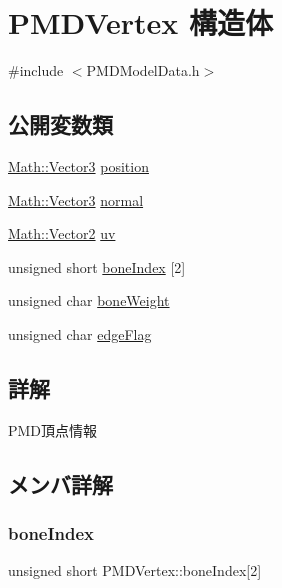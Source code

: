 \hypertarget{struct_p_m_d_vertex}{}\section{P\+M\+D\+Vertex 構造体}
\label{struct_p_m_d_vertex}


{\ttfamily \#include $<$P\+M\+D\+Model\+Data.\+h$>$}

\subsection*{公開変数類}
\begin{DoxyCompactItemize}
\item 
\mbox{\hyperlink{struct_math_1_1_vector3}{Math\+::\+Vector3}} \mbox{\hyperlink{struct_p_m_d_vertex_af9eb3741205512ac55530a52d0102bc0}{position}}
\item 
\mbox{\hyperlink{struct_math_1_1_vector3}{Math\+::\+Vector3}} \mbox{\hyperlink{struct_p_m_d_vertex_afa1e149594fbe11bc4cb3747d8e85c56}{normal}}
\item 
\mbox{\hyperlink{struct_math_1_1_vector2}{Math\+::\+Vector2}} \mbox{\hyperlink{struct_p_m_d_vertex_a42049ecad8df8c3708079463a7b85281}{uv}}
\item 
unsigned short \mbox{\hyperlink{struct_p_m_d_vertex_a9b3e6edca54f4f29192b47388b5e757c}{bone\+Index}} \mbox{[}2\mbox{]}
\item 
unsigned char \mbox{\hyperlink{struct_p_m_d_vertex_af60fe66bc32b1cd4b4f7025e68b887a4}{bone\+Weight}}
\item 
unsigned char \mbox{\hyperlink{struct_p_m_d_vertex_a08c82b0d461f3dab3565918ef5a6cec0}{edge\+Flag}}
\end{DoxyCompactItemize}


\subsection{詳解}
P\+M\+D頂点情報 

\subsection{メンバ詳解}
\mbox{\label{struct_p_m_d_vertex_a9b3e6edca54f4f29192b47388b5e757c}} 
\subsubsection{\texorpdfstring{bone\+Index}{boneIndex}}
{\footnotesize\ttfamily unsigned short P\+M\+D\+Vertex\+::bone\+Index\mbox{[}2\mbox{]}}

